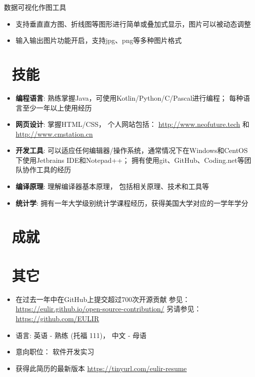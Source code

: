 \documentclass{resume}
\begin{document}
数据可视化作图工具
\begin{itemize}
  \item 支持垂直直方图、折线图等图形进行简单或叠加式显示，图片可以被动态调整
  \item 输入输出图片功能开启，支持jpg、png等多种图片格式
\end{itemize}

\section{\faCogs\ 技能}
\begin{itemize}[parsep=0.5ex]
  \item \textbf{编程语言}:
    熟练掌握Java，可使用Kotlin/Python/C/Pascal进行编程； 每种语言至少一年以上使用经历
  \item \textbf{网页设计}:
    掌握HTML/CSS， 个人网站包括： {\url{http://www.neofuture.tech}} 和 {\url{http://www.cmstation.cn}}
  \item \textbf{开发工具}:
    可以适应任何编辑器/操作系统，通常情况下在Windows和CentOS下使用Jetbrains IDE和Notepad++； 拥有使用git、GitHub、Coding.net等团队协作工具的经历
  \item \textbf{编译原理}:
    理解编译器基本原理， 包括相关原理、技术和工具等 
  \item \textbf{统计学}:
    拥有一年大学级别统计学课程经历，获得美国大学对应的一学年学分
\end{itemize}

\section{\faHeartO\ 成就}

\section{\faInfo\ 其它}
\begin{itemize}[parsep=0.5ex]
  \item 在过去一年中在GitHub上提交超过700次开源贡献 参见： \url{https://eulir.github.io/open-source-contribution/} 
    另请参见： {\url{https://github.com/EULIR}}
  \item 语言: 英语 - 熟练 (托福 111)， 中文 - 母语
  \item 意向职位： 软件开发实习
  \item 获得此简历的最新版本 \url{https://tinyurl.com/eulir-resume}
\end{itemize}


%
%
\end{document}
